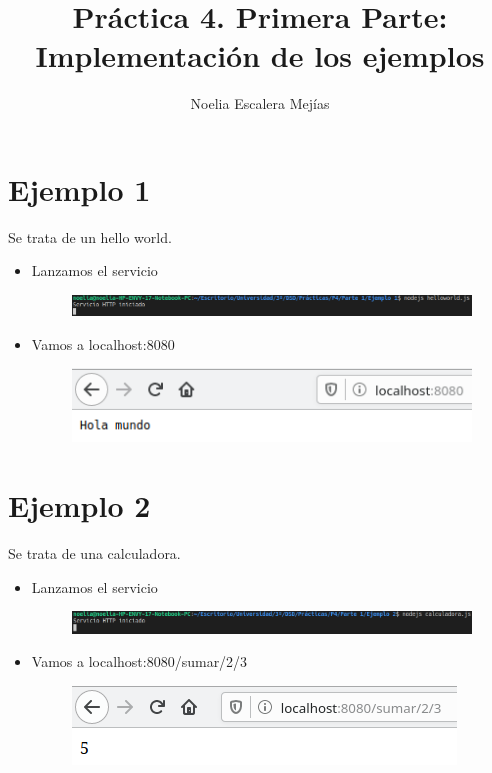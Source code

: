 \documentclass{article}
\title{Práctica 4. Primera Parte: Implementación de los ejemplos}
\author{Noelia Escalera Mejías}
\begin{document}
	\maketitle
	\section{Ejemplo 1}
	Se trata de un hello world.
	\begin{itemize}
		\item Lanzamos el servicio
		\begin{figure}[H]
			\centering
			\includegraphics[totalheight=0.7cm]{img/1.png}
		\end{figure}
		\item Vamos a localhost:8080
		\begin{figure}[H]
			\centering
			\includegraphics[totalheight=2cm]{img/2.png}
		\end{figure}
	\end{itemize}
	\section{Ejemplo 2}
	Se trata de una calculadora.
	\begin{itemize}
	\item Lanzamos el servicio
	\begin{figure}[H]
		\centering
		\includegraphics[totalheight=0.7cm]{img/3.png}
	\end{figure}
	\item Vamos a localhost:8080/sumar/2/3
	\begin{figure}[H]
		\centering
		\includegraphics[totalheight=2cm]{img/4.png}
	\end{figure}
	\end{itemize}
\end{document}
